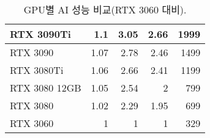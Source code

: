 \begin{table}[]
{\begin{tabular}{|l|r|r|r|r|}
RTX 3090Ti    & 1.1                                                                                                                 & 3.05                                                                                                                                               & 2.66                                                                                                                                                & 1999                               \\ \hline
RTX 3090      & 1.07                                                                                                                & 2.78                                                                                                                                               & 2.46                                                                                                                                                & 1499                               \\ \hline
RTX 3080Ti    & 1.06                                                                                                                & 2.66                                                                                                                                               & 2.41                                                                                                                                                & 1199                               \\ \hline
RTX 3080 12GB & 1.05                                                                                                                & 2.54                                                                                                                                               & 2                                                                                                                                                   & 799                                \\ \hline
RTX 3080      & 1.02                                                                                                                & 2.29                                                                                                                                               & 1.95                                                                                                                                                & 699                                \\ \hline
RTX 3060      & 1                                                                                                                   & 1                                                                                                                                                  & 1                                                                                                                                                   & 329                                \\ \hline
\end{tabular}%
}
\caption{\label{conclusiontable}GPU별 AI 성능 비교(RTX 3060 대비).}
\end{table}

